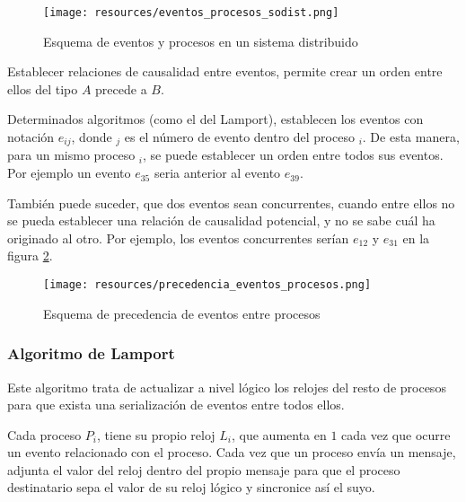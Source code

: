 \documentclass[a4paper, 11pt, titlepage]{article}
\begin{document}
        \begin{figure}[htp]
            \centering
            \texttt{[image: resources/eventos\_procesos\_sodist.png]}
            \caption{Esquema de eventos y procesos en un sistema distribuido}
            \label{eventos_procesos_sodist}
        \end{figure}

        Establecer relaciones de causalidad entre eventos, permite crear un orden entre ellos del tipo 
        $A$ precede a $B$.

        Determinados algoritmos (como el del Lamport), establecen los eventos con notación $e_{ij}$, donde $_j$ 
        es el número de evento dentro del proceso $_i$. De esta manera, para un mismo proceso $_i$, se puede 
        establecer un orden entre todos sus eventos. Por ejemplo un evento $e_{35}$ seria anterior al evento 
        $e_{39}$.

        También puede suceder, que dos eventos sean concurrentes, cuando entre ellos no se pueda 
        establecer una relación de causalidad potencial, y no se sabe cuál ha originado al otro. Por 
        ejemplo, los eventos concurrentes serían $e_{12}$ y $e_{31}$ en la figura 
        \ref{precedencia_eventos_procesos}.

        \begin{figure}[htp]
            \centering
            \texttt{[image: resources/precedencia\_eventos\_procesos.png]}
            \caption{Esquema de precedencia de eventos entre procesos}
            \label{precedencia_eventos_procesos}
        \end{figure}

        \subsubsection{Algoritmo de Lamport}

            Este algoritmo trata de actualizar a nivel lógico los relojes del resto de procesos para que 
            exista una serialización de eventos entre todos ellos.
            
            Cada proceso $P_i$, tiene su propio reloj $L_i$, que aumenta en $1$ cada vez que ocurre un 
            evento relacionado con el proceso. Cada vez que un proceso envía un mensaje, adjunta el valor
            del reloj dentro del propio mensaje para que el proceso destinatario sepa el valor de su reloj 
            lógico y sincronice así el suyo.
\end{document}

